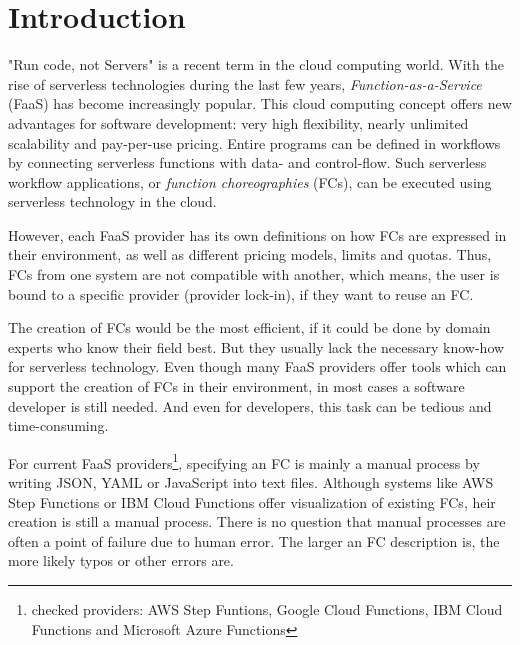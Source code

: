 \documentclass[a4paper,top=25mm,bottom=25mm,12pt,pdftex,halfparskip,twoside,openany,bibtotoc,numbers=noenddot]{scrbook}
\begin{document}
\tableofcontents

\listoffigures

\listoftables

\mainmatter
\pagestyle{fancy}

\renewcommand{\chaptermark}[1]{%
	\markboth{\thechapter.\ #1}{}
}

\fancyhead{}
\fancyhead[LO]{\leftmark}
\fancyhead[RE]{\rightmark}
\fancyfoot{}
\fancyfoot[LO,RE]{\thepage}

\label{chap:introduction}
\chapter{Introduction}

"Run code, not Servers" is a recent term in the cloud computing world.
With the rise of serverless technologies during the last few years, \emph{Function-as-a-Service} (FaaS) has become increasingly popular. This cloud computing concept offers new advantages for software development: very high flexibility, nearly unlimited scalability and pay-per-use pricing. Entire programs can be defined in workflows by connecting serverless functions with data- and control-flow. Such serverless workflow applications, or \textit{function choreographies} (FCs), can be executed using serverless technology in the cloud.

However, each FaaS provider has its own definitions on how FCs are expressed in their environment, as well as different pricing models, limits and quotas. Thus, FCs from one system are not compatible with another, which means, the user is bound to a specific provider (provider lock-in), if they want to reuse an FC.

The creation of FCs would be the most efficient, if it could be done by domain experts who know their field best. But they usually lack the necessary know-how for serverless technology. Even though many FaaS providers offer tools which can support the creation of FCs in their environment, in most cases a software developer is still needed. And even for developers, this task can be tedious and time-consuming.

For current FaaS providers\footnote{\label{note:checked-providers}checked providers: AWS Step Funtions, Google Cloud Functions, IBM Cloud Functions and Microsoft Azure Functions}, specifying an FC is mainly a manual process by writing JSON, YAML or JavaScript into text files.
Although systems like AWS Step Functions or IBM Cloud Functions offer visualization of existing FCs, heir creation is still a manual process.
There is no question that manual processes are often a point of failure due to human error. The larger an FC description is, the more likely typos or other errors are.
\end{document}
